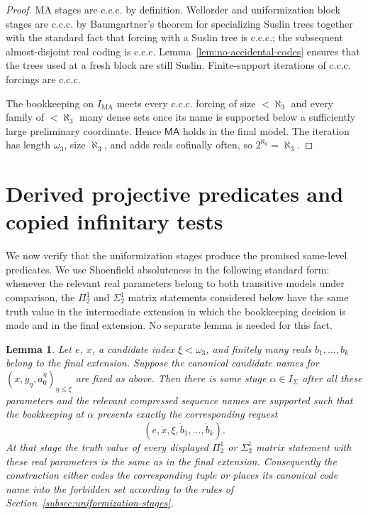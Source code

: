 \documentclass[11pt]{article}
\theoremstyle{plain}
\newtheorem{lemma}[theorem]{Lemma}
\theoremstyle{definition}
\theoremstyle{remark}
\newcommand{\MA}{\mathsf{MA}}
\begin{document}
\begin{proof}
MA stages are c.c.c. by definition.  Wellorder and uniformization block stages
are c.c.c. by Baumgartner's theorem for specializing Suslin trees together with
the standard fact that forcing with a Suslin tree is c.c.c.; the subsequent
almost-disjoint real coding is c.c.c.  Lemma~\ref{lem:no-accidental-codes}
ensures that the trees used at a fresh block are still Suslin.  Finite-support
iterations of c.c.c. forcings are c.c.c.

The bookkeeping on $I_{\mathrm{MA}}$ meets every c.c.c. forcing of size
$<\aleph_3$ and every family of $<\aleph_3$ many dense sets once its name is
supported below a sufficiently large preliminary coordinate.  Hence $\MA$ holds
in the final model.  The iteration has length $\omega_3$, size $\aleph_3$, and
adds reals cofinally often, so $2^{\aleph_0}=\aleph_3$.
\end{proof}

\section{Derived projective predicates and copied infinitary tests}\label{sec:uniformization}

We now verify that the uniformization stages produce the promised same-level
predicates.  We use Shoenfield absoluteness in the following standard form:
whenever the relevant real parameters belong to both transitive models under
comparison, the $\Pi^1_2$ and $\Sigma^1_2$ matrix statements considered below
have the same truth value in the intermediate extension in which the
bookkeeping decision is made and in the final extension.  No separate lemma is
needed for this fact.


\begin{lemma}\label{lem:bookkeeping-complete}
Let $e$, $x$, a candidate index $\xi<\omega_3$, and finitely many reals
$b_1,\ldots,b_k$ belong to the final extension.  Suppose the canonical candidate
names for $(x,y_\eta,a^\eta_0)_{\eta\leq\xi}$ are fixed as above.  Then there is
some stage $\alpha\in I_\Sigma$ after all these parameters and the relevant
compressed sequence names are supported such that the bookkeeping at $\alpha$
presents exactly the corresponding request
\[
(e,\dot x,\xi,\dot b_1,\ldots,\dot b_k).
\]
At that stage the truth value of every displayed $\Pi^1_2$ or $\Sigma^1_2$ matrix
statement with these real parameters is the same as in the final extension.
Consequently the construction either codes the corresponding tuple or places its
canonical code name into the forbidden set according to the rules of
Section~\ref{subsec:uniformization-stages}.
\end{lemma}
\end{document}

